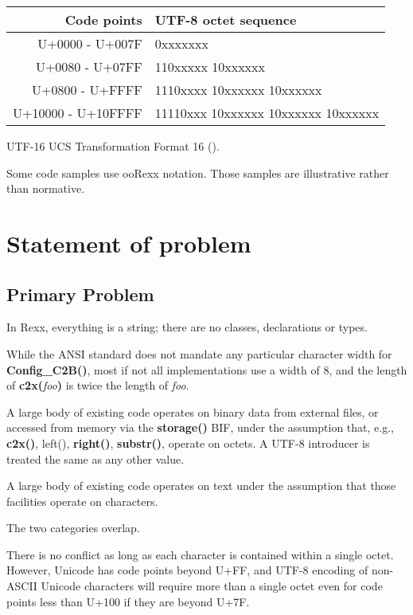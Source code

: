 \documentclass[b4paper]{article}
\begin{document}
\begin{definition}
\begin{tabular}{| r | l |}
\hline
Code points & UTF-8 octet sequence \\
\hline
U+0000 - U+007F    & 0xxxxxxx \\
\hline
U+0080 - U+07FF    & 110xxxxx 10xxxxxx \\
\hline
U+0800 - U+FFFF    & 1110xxxx 10xxxxxx 10xxxxxx \\
\hline
U+10000 - U+10FFFF & 11110xxx 10xxxxxx 10xxxxxx 10xxxxxx \\
\hline
\end{tabular}
\item [UTF-16] UCS Transformation Format 16 (\cite{RFC 2781}).
\end{definition}

Some code samples use ooRexx notation. Those samples are illustrative rather than normative.


\section{Statement of problem}

\subsection{Primary Problem}

In Rexx, everything is a string; there are no classes, declarations or types.

While the ANSI standard does not mandate any particular character width for \textbf{Config\_C2B()},
most if not all implementations use a width of 8,
and the length of \textbf{c2x(}\textit{foo}\textbf{)}
is twice the length of \textit{foo}.

A large body of existing code operates on binary data from external files,
or accessed from memory via the \textbf{storage()} BIF,
under the assumption that, e.g., \textbf{c2x()}, left(), \textbf{right()}, \textbf{substr()}, operate on octets.
A UTF-8 introducer is treated the same as any other value.

A large body of existing code operates on text under the assumption that those facilities operate on characters.

The two categories overlap.

There is no conflict as long as each character is contained within a single octet.
However, Unicode has code points beyond U+FF,
and UTF-8 encoding of non-ASCII Unicode characters will
require more than a single octet even for code points less than U+100 if they are beyond U+7F.
\end{document}
